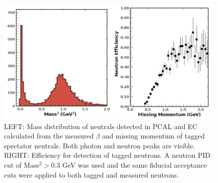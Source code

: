\begin{figure}[h]
\centering
\includegraphics[width=1.0\columnwidth,keepaspectratio]{img/S10_4_3.png}
\caption[]{LEFT: Mass distribution of neutrals detected in PCAL and EC calculated from the measured $\beta$ and missing momentum of tagged spectator neutrals.  Both photon and neutron peaks are visible. RIGHT: Efficiency for detection of tagged neutrons.  A neutron PID cut of Mass$^2>$0.3 GeV was used and the same fiducial acceptance cuts were applied to both tagged and measured neutrons.}
\label{fig:S10_4_3}
\end{figure}



